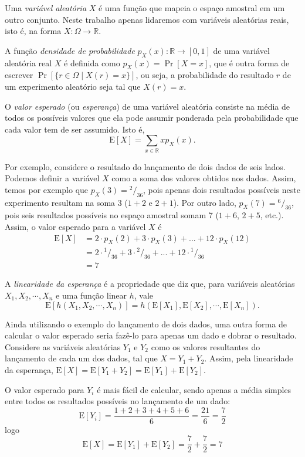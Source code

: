 Uma \emph{variável aleatória} $X$ é uma função que mapeia o espaço amostral em um outro conjunto. Neste trabalho apenas lidaremos com variáveis aleatórias reais, isto é, na forma $X : \Omega \to \mathbb{R}$. 

A função \emph{densidade de probabilidade} $p_X(x) : \mathbb{R} \to [0, 1]$ de uma variável aleatória real $X$ é definida como $p_X(x) = \Pr[X = x]$, que é outra forma de escrever $\Pr[\{r \in \Omega \mid X(r) = x\}]$, ou seja, a probabilidade do resultado $r$ de um experimento aleatório seja tal que $X(r) = x$.

O \emph{valor esperado} (ou \emph{esperança}) de uma variável aleatória consiste na média de todos os possíveis valores que ela pode assumir ponderada pela probabilidade que cada valor tem de ser assumido. Isto é,
\[
    \text{E}[X] = \sum_{x \in \mathbb{R}} x p_X(x).
\]

Por exemplo, considere o resultado do lançamento de dois dados de seis lados. Podemos definir a variável $X$ como a soma dos valores obtidos nos dados. Assim, temos por exemplo que $p_X(3) = {^2/_{36}}$, pois apenas dois resultados possíveis neste experimento resultam na soma 3 ($1+2$ e $2+1$). Por outro lado, $p_X(7) = {^6/_{36}}$, pois seis resultados possíveis no espaço amostral somam 7 ($1+6$, $2+5$, etc.). Assim, o valor esperado para a variável $X$ é
\begin{align*}
    \text{E}[X] &= 2 \cdot p_X(2) + 3 \cdot p_X(3) + ... + 12 \cdot p_X(12) \\
          &= 2 \cdot {^1/_{36}} + 3 \cdot {^2/_{36}} + ... + 12 \cdot {^1/_{36}} \\
          &= 7
\end{align*}

A \emph{linearidade da esperança} é a propriedade que diz que, para variáveis aleatórias $X_1, X_2, \cdots, X_n$ e uma função linear $h$, vale
\[
    \text{E}[h(X_1, X_2, \cdots, X_n)] = h(\text{E}[X_1], \text{E}[X_2], \cdots, \text{E}[X_n])\text{.}
\]

Ainda utilizando o exemplo do lançamento de dois dados, uma outra forma de calcular o valor esperado seria fazê-lo para apenas um dado e dobrar o resultado. Considere as variáveis aleatórias $Y_1$ e $Y_2$ como os valores resultantes do lançamento de cada um dos dados, tal que $X = Y_1 + Y_2$. Assim, pela linearidade da esperança, $\text{E}[X] = \text{E}[Y_1 + Y_2] = \text{E}[Y_1] + \text{E}[Y_2]$. 

O valor esperado para $Y_i$ é mais fácil de calcular, sendo apenas a média simples entre todos os resultados possíveis no lançamento de um dado:
\[
    \text{E}[Y_i] = \frac{1+2+3+4+5+6}{6} = \frac{21}{6} = \frac{7}{2}
\]
logo
\[
    \text{E}[X] = \text{E}[Y_1] + \text{E}[Y_2]  = \frac{7}{2} + \frac{7}{2} = 7
\]


